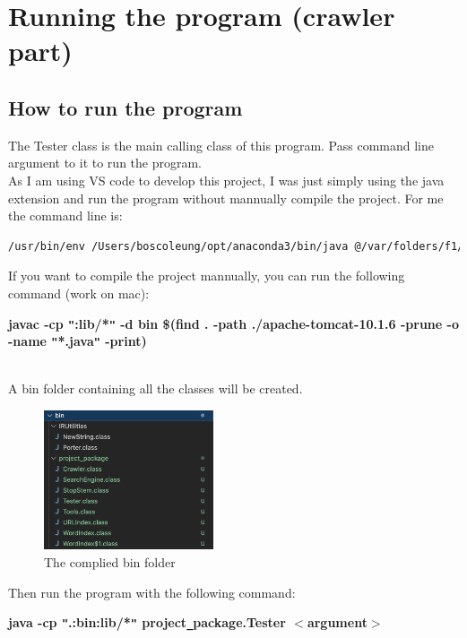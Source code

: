 \documentclass{article}
\begin{document}
    \newpage
    \section*{Running the program (crawler part)}
    \subsection*{How to run the program}
    
        The Tester class is the main calling class of this program. Pass command line argument to it to run the program. \\[0.4em]
        As I am using VS code to develop this project, I was just simply using the java extension and run the program without mannually compile the project. 
        For me the command line is:
        \begin{lstlisting}[language=bash,breaklines=true]
            /usr/bin/env /Users/boscoleung/opt/anaconda3/bin/java @/var/folders/f1/6mvnwxt109n9rswystbch0t40000gn/T/cp_dh97avm16bvprxybpew6los8v.argfile project_package.Tester <argument>
        \end{lstlisting}

        If you want to compile the project mannually, you can run the following command (work on mac): \\[0.8em]
        \centerline{\textbf{javac -cp \texttt{"}:lib/*\texttt{"} -d bin \$(find . -path ./apache-tomcat-10.1.6 -prune -o -name \texttt{"}*.java\texttt{"} -print)}} \\[0.1em]

        A bin folder containing all the classes will be created.
        \begin{figure}[!htbp]
            \centering
            \caption{The complied bin folder}
            \label{}
            \includegraphics[width=5cm]{compliedBin.png}
        \end{figure}

        Then run the program with the following command: \\[0.8em]
        \centerline{\textbf{java -cp \texttt{"}.:bin:lib/*\texttt{"} project\texttt{\_}package.Tester $<$argument$>$}}
\end{document}
